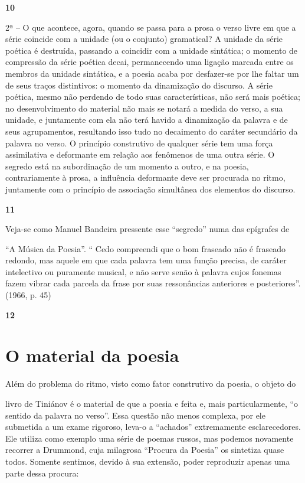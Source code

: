 \textbf{10}

2ª -- O que acontece, agora, quando se passa para a prosa o verso livre
em que a série coincide com a unidade (ou o conjunto) gramatical? A
unidade da série poética é destruída, passando a coincidir com a unidade
sintática; o momento de compressão da série poética decai, permanecendo
uma ligação marcada entre os membros da unidade sintática, e a poesia
acaba por desfazer-se por lhe faltar um de seus traços distintivos: o
momento da dinamização do discurso. A série poética, mesmo não perdendo
de todo suas características, não será mais poética; no desenvolvimento
do material não mais se notará a medida do verso, a sua unidade, e
juntamente com ela não terá havido a dinamização da palavra e de seus
agrupamentos, resultando isso tudo no decaimento do caráter secundário
da palavra no verso. O princípio construtivo de qualquer série tem uma
força assimilativa e deformante em relação aos fenômenos de uma outra
série. O segredo está na subordinação de um momento a outro, e na
poesia, contrariamente à prosa, a influência deformante deve ser
procurada no ritmo, juntamente com o princípio de associação simultânea
dos elementos do discurso.

\textbf{11}

Veja-se como Manuel Bandeira pressente esse ``segredo'' numa das
epígrafes de

``A Música da Poesia''. `` Cedo compreendi que o bom fraseado não é
fraseado redondo, mas aquele em que cada palavra tem uma função precisa,
de caráter intelectivo ou puramente musical, e não serve senão à palavra
cujos fonemas fazem vibrar cada parcela da frase por suas ressonâncias
anteriores e posteriores''. (1966, p. 45)

\textbf{12}

\section{O material da poesia}

Além do problema do ritmo, visto como fator construtivo da poesia, o
objeto do

livro de Tiniánov é o material de que a poesia e feita e, mais
particularmente, ``o sentido da palavra no verso''. Essa questão não
menos complexa, por ele submetida a um exame rigoroso, leva-o a
``achados'' extremamente esclarecedores. Ele utiliza como exemplo uma
série de poemas russos, mas podemos novamente recorrer a Drummond, cuja
milagrosa ``Procura da Poesia'' os sintetiza quase todos. Somente
sentimos, devido à sua extensão, poder reproduzir apenas uma parte dessa
procura:

